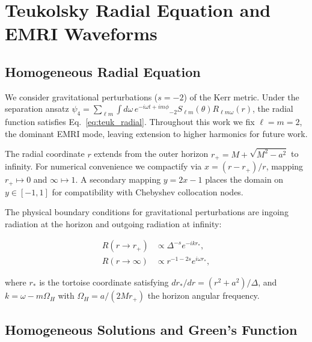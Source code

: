 \documentclass[aps,prd,twocolumn,superscriptaddress,nofootinbib]{revtex4-2}
\begin{document}
\section{Teukolsky Radial Equation and EMRI Waveforms}
\label{sec:physics}

\subsection{Homogeneous Radial Equation}

We consider gravitational perturbations ($s=-2$) of the Kerr metric.  Under the
separation ansatz $\psi_4 = \sum_{\ell m} \int d\omega\, e^{-i\omega t + im\phi}
{}_{-2}S_{\ell m}(\theta) R_{\ell m \omega}(r)$, the radial function satisfies
Eq.~\eqref{eq:teuk_radial}.  Throughout this work we fix $\ell = m = 2$, the
dominant EMRI mode, leaving extension to higher harmonics for future work.

The radial coordinate $r$ extends from the outer horizon
$r_+ = M + \sqrt{M^2 - a^2}$ to infinity.  For numerical convenience we
compactify via $x = (r - r_+)/r$, mapping $r_+ \mapsto 0$ and $\infty \mapsto 1$.
A secondary mapping $y = 2x - 1$ places the domain on $y \in [-1, 1]$ for
compatibility with Chebyshev collocation nodes.

The physical boundary conditions for gravitational perturbations are
ingoing radiation at the horizon and outgoing radiation at infinity:

\begin{align}
  R(r \to r_+) &\propto \Delta^{-s} e^{-i k r_*},
    \label{eq:bc_horizon} \\
  R(r \to \infty) &\propto r^{-1-2s} e^{i \omega r_*},
    \label{eq:bc_infinity}
\end{align}

where $r_*$ is the tortoise coordinate satisfying $dr_*/dr = (r^2 +
a^2)/\Delta$, and $k = \omega - m\Omega_H$ with $\Omega_H = a/(2Mr_+)$ the
horizon angular frequency.

\subsection{Homogeneous Solutions and Green's Function}
\label{sec:green}
\end{document}
